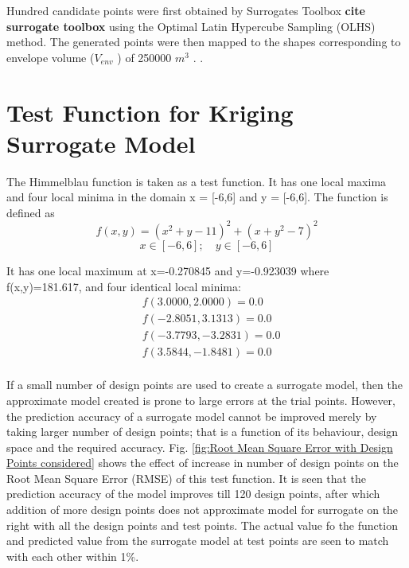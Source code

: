Hundred candidate points were first obtained by Surrogates Toolbox \textbf{cite surrogate toolbox} using the Optimal Latin Hypercube Sampling (OLHS) method. The generated points were then mapped to the shapes corresponding to envelope volume ($ V _{env} $ ) of 250000 $ m^3 $ . .


\section{Test Function for Kriging Surrogate Model}
The Himmelblau function is taken as a test function.  It has one local maxima and four local minima in the domain x = [-6,6] and y = [-6,6]. The function is defined as 
\begin{equation}
f(x,y) = (x^2 + y - 11)^2  + (x + y^2 - 7)^2 
\end{equation}
\begin{equation}
x \in [-6,6] ;\quad y \in [-6,6]
\end{equation}

It has one local maximum at x=-0.270845 and y=-0.923039 where f(x,y)=181.617, and four identical local minima:
\begin{align}
&f( 3.0000 , 2.0000 )=0.0 \\
&f( -2.8051 , 3.1313 )=0.0 \\
&f( -3.7793 , -3.2831 )=0.0 \\
&f( 3.5844 , -1.8481 )=0.0 \\
\end{align}

If a small number of design points are used to create a surrogate model, then the approximate model created is prone to large errors at the trial points. However, the prediction accuracy of a surrogate model cannot be improved merely by taking larger number of design points; that is a function of its behaviour, design space and the required accuracy. Fig. \ref{fig:Root Mean Square Error with Design Points considered} shows the effect of increase in number of design points on the Root Mean Square Error (RMSE) of this test function. It is seen that the prediction accuracy of the model improves till 120 design points, after which addition of more design points does not approximate model for surrogate on the right with all the design points and test points. The actual value fo the function and predicted value from the surrogate model at test points are seen to match with each other within 1\%.

